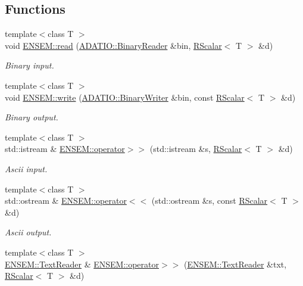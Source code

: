 \subsection*{Functions}
\begin{DoxyCompactItemize}
\item 
{\footnotesize template$<$class T $>$ }\\void \mbox{\hyperlink{group__rscalar_gaccfe83f3d505a988121c117c9383f188}{E\+N\+S\+E\+M\+::read}} (\mbox{\hyperlink{classADATIO_1_1BinaryReader}{A\+D\+A\+T\+I\+O\+::\+Binary\+Reader}} \&bin, \mbox{\hyperlink{classENSEM_1_1RScalar}{R\+Scalar}}$<$ T $>$ \&d)
\begin{DoxyCompactList}\small\item\em Binary input. \end{DoxyCompactList}\item 
{\footnotesize template$<$class T $>$ }\\void \mbox{\hyperlink{group__rscalar_ga22fa002fd1c18dfe5d521aef45102477}{E\+N\+S\+E\+M\+::write}} (\mbox{\hyperlink{classADATIO_1_1BinaryWriter}{A\+D\+A\+T\+I\+O\+::\+Binary\+Writer}} \&bin, const \mbox{\hyperlink{classENSEM_1_1RScalar}{R\+Scalar}}$<$ T $>$ \&d)
\begin{DoxyCompactList}\small\item\em Binary output. \end{DoxyCompactList}\item 
{\footnotesize template$<$class T $>$ }\\std\+::istream \& \mbox{\hyperlink{group__rscalar_ga20742b8ba8dde3fd2bb81883ac983c5f}{E\+N\+S\+E\+M\+::operator$>$$>$}} (std\+::istream \&s, \mbox{\hyperlink{classENSEM_1_1RScalar}{R\+Scalar}}$<$ T $>$ \&d)
\begin{DoxyCompactList}\small\item\em Ascii input. \end{DoxyCompactList}\item 
{\footnotesize template$<$class T $>$ }\\std\+::ostream \& \mbox{\hyperlink{group__rscalar_ga362d60e2c1d2c88b747e44c6102f87db}{E\+N\+S\+E\+M\+::operator$<$$<$}} (std\+::ostream \&s, const \mbox{\hyperlink{classENSEM_1_1RScalar}{R\+Scalar}}$<$ T $>$ \&d)
\begin{DoxyCompactList}\small\item\em Ascii output. \end{DoxyCompactList}\item 
{\footnotesize template$<$class T $>$ }\\\mbox{\hyperlink{classENSEM_1_1TextReader}{E\+N\+S\+E\+M\+::\+Text\+Reader}} \& \mbox{\hyperlink{group__rscalar_ga4ebc0db18feecd564535eb9b6011c854}{E\+N\+S\+E\+M\+::operator$>$$>$}} (\mbox{\hyperlink{classENSEM_1_1TextReader}{E\+N\+S\+E\+M\+::\+Text\+Reader}} \&txt, \mbox{\hyperlink{classENSEM_1_1RScalar}{R\+Scalar}}$<$ T $>$ \&d)

\end{DoxyCompactItemize}
